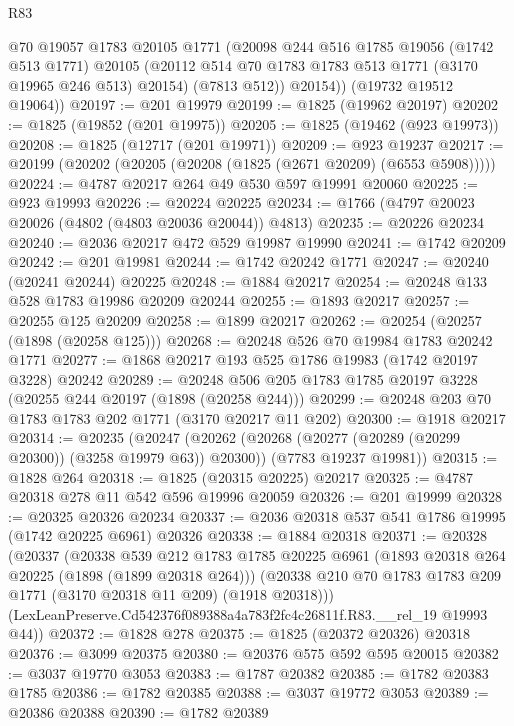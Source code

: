 \begin{lexlean}{R83}
\begin{coremodule}
          @70
          @19057
          @1783
          @20105
          @1771
          (@20098
            @244
            @516
            @1785
            @19056
            (@1742 @513 @1771)
            @20105
            (@20112 @514 @70 @1783 @1783 @513 @1771 (@3170 @19965 @246 @513) @20154)
            (@7813 @512))
          @20154))
      (@19732 @19512 @19064))
@20197 := @201 @19979
@20199 := @1825 (@19962 @20197)
@20202 := @1825 (@19852 (@201 @19975))
@20205 := @1825 (@19462 (@923 @19973))
@20208 := @1825 (@12717 (@201 @19971))
@20209 := @923 @19237
@20217 := @20199 (@20202 (@20205 (@20208 (@1825 (@2671 @20209) (@6553 @5908)))))
@20224 := @4787 @20217 @264 @49 @530 @597 @19991 @20060
@20225 := @923 @19993
@20226 := @20224 @20225
@20234 := @1766 (@4797 @20023 @20026 (@4802 (@4803 @20036 @20044)) @4813)
@20235 := @20226 @20234
@20240 := @2036 @20217 @472 @529 @19987 @19990
@20241 := @1742 @20209
@20242 := @201 @19981
@20244 := @1742 @20242 @1771
@20247 := @20240 (@20241 @20244) @20225
@20248 := @1884 @20217
@20254 := @20248 @133 @528 @1783 @19986 @20209 @20244
@20255 := @1893 @20217
@20257 := @20255 @125 @20209
@20258 := @1899 @20217
@20262 := @20254 (@20257 (@1898 (@20258 @125)))
@20268 := @20248 @526 @70 @19984 @1783 @20242 @1771
@20277 := @1868 @20217 @193 @525 @1786 @19983 (@1742 @20197 @3228) @20242
@20289 := @20248 @506 @205 @1783 @1785 @20197 @3228 (@20255 @244 @20197 (@1898 (@20258 @244)))
@20299 := @20248 @203 @70 @1783 @1783 @202 @1771 (@3170 @20217 @11 @202)
@20300 := @1918 @20217
@20314 := @20235
    (@20247
      (@20262 (@20268 (@20277 (@20289 (@20299 @20300)) (@3258 @19979 @63)) @20300))
      (@7783 @19237 @19981))
@20315 := @1828 @264
@20318 := @1825 (@20315 @20225) @20217
@20325 := @4787 @20318 @278 @11 @542 @596 @19996 @20059
@20326 := @201 @19999
@20328 := @20325 @20326 @20234
@20337 := @2036 @20318 @537 @541 @1786 @19995 (@1742 @20225 @6961) @20326
@20338 := @1884 @20318
@20371 := @20328
    (@20337
      (@20338
        @539
        @212
        @1783
        @1785
        @20225
        @6961
        (@1893 @20318 @264 @20225 (@1898 (@1899 @20318 @264)))
        (@20338 @210 @70 @1783 @1783 @209 @1771 (@3170 @20318 @11 @209) (@1918 @20318)))
      (LexLeanPreserve.Cd542376f089388a4a783f2fc4c26811f.R83.__rel_19 @19993 @44))
@20372 := @1828 @278
@20375 := @1825 (@20372 @20326) @20318
@20376 := @3099 @20375
@20380 := @20376 @575 @592 @595 @20015
@20382 := @3037 @19770 @3053
@20383 := @1787 @20382
@20385 := @1782 @20383 @1785
@20386 := @1782 @20385
@20388 := @3037 @19772 @3053
@20389 := @20386 @20388
@20390 := @1782 @20389

\end{coremodule}
\end{lexlean}
